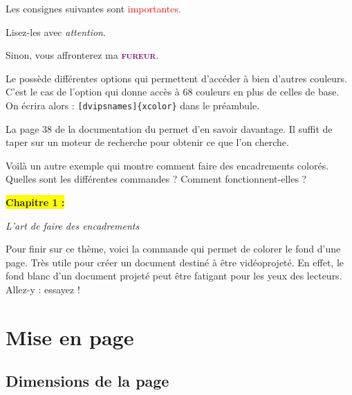 \documentclass[10pt,french]{book}
\begin{document}
{\NewFont
\begin{SideBySideExample}
    \color{blue}
    Les consignes suivantes sont
    \textcolor{red}{importantes.}\par
    Lisez-les avec \textit{attention}.\par
    Sinon, vous affronterez ma
    \textcolor{purple}{\textbf{\textsc{fureur}}}.
\end{SideBySideExample}
}

\begin{info}
    Le \package {} possède différentes options qui permettent d'accéder à bien d'autres couleurs. C'est le cas de l'option  qui donne accès à 68 couleurs en plus de celles de base. On écrira alors : \texttt{[dvipsnames]\{xcolor\}} dans le préambule.\par
    La page 38 de la documentation du \package permet d'en savoir davantage. Il suffit de taper sur un moteur de recherche  pour obtenir ce que l'on cherche.
\end{info}

Voilà un autre exemple qui montre comment faire des encadrements colorés. Quelles sont les différentes commandes ? Comment fonctionnent-elles ?\bigskip

{\NewFont
\begin{SideBySideExample}
    \begin{center}
        \colorbox{yellow}{\textbf{Chapitre 1 :}}\par
        \textit{L'art de faire des encadrements}
    \end{center}
\end{SideBySideExample}
\bigskip}

Pour finir sur ce thème, voici la commande  qui permet de colorer le fond d'une page. Très utile pour créer un document destiné à être vidéoprojeté. En effet, le fond blanc d'un document projeté peut être fatigant pour les yeux des lecteurs. Allez-y : essayez !

\section{Mise en page}

\subsection{Dimensions de la page}
\end{document}
